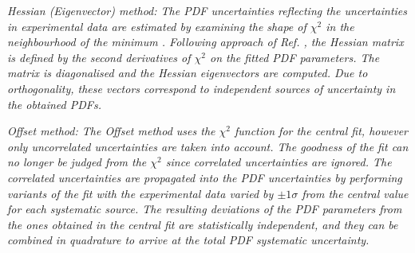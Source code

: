 \begin{description}
\item \it{Hessian (Eigenvector) method:} \rm
The PDF uncertainties reflecting the uncertainties in experimental data are estimated by 
examining the shape of $\chi^2$ in the neighbourhood of the minimum \cite{Pumplin:2001ct}.
Following approach of Ref. \cite{Pumplin:2001ct}, the Hessian matrix is defined by the second 
derivatives of $\chi^2$ on the fitted PDF parameters. The matrix is diagonalised and the 
Hessian eigenvectors are computed. 
Due to orthogonality, these vectors correspond to independent sources of
uncertainty in the obtained PDFs.
\\
%

\item \it{Offset  method:} \rm
The Offset method \cite{Botje:2001fx} uses
%
the $\chi^2$ function for the central fit, however only
uncorrelated uncertainties are taken into account. 
The goodness of the fit can no longer be judged from the $\chi^2$ since correlated uncertainties are ignored. 
The correlated uncertainties are propagated into the PDF uncertainties by performing variants 
of the fit with the experimental data varied by $\pm 1 \sigma$ from the central value  
for each systematic source.
The resulting deviations of the PDF parameters from the ones obtained in the central 
fit are statistically independent, and they can be combined in quadrature to arrive at the total 
PDF systematic uncertainty.
%


\end{description}
